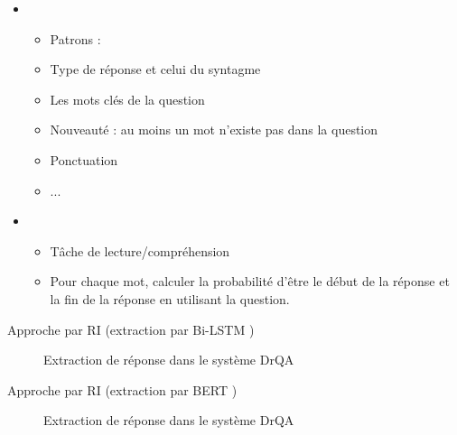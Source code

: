 \documentclass{KodeBook}
\begin{document}
\begin{itemize}
	\item {}
	\begin{itemize}
		\item Patrons : 
		\item Type de réponse et celui du syntagme
		\item Les mots clés de la question
		\item Nouveauté : au moins un mot n'existe pas dans la question
		\item Ponctuation
		\item ...
	\end{itemize}
	\item {}
	\begin{itemize}
		\item Tâche de lecture/compréhension
		\item Pour chaque mot, calculer la probabilité d'être le début de la réponse et la fin de la réponse en utilisant la question. 
	\end{itemize}
\end{itemize}

Approche par RI (extraction par Bi-LSTM \cite{2017-chen-al})

\begin{figure}
	\caption{Extraction de réponse dans le système DrQA \cite{2019-jurafsky-martin}}
\end{figure}

Approche par RI (extraction par BERT \cite{2018-devlin-al})

\begin{figure}
	\centering
	\caption{Extraction de réponse dans le système DrQA \cite{2019-jurafsky-martin}}
\end{figure}
\end{document}
